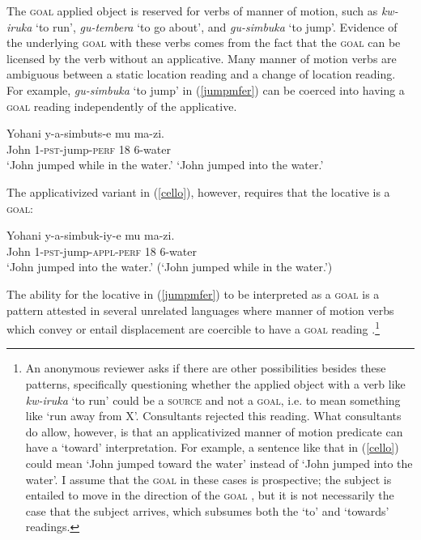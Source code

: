\documentclass[output=paper]{langsci/langscibook}
\begin{document}
The {\scshape goal} applied object is reserved for verbs of manner of motion, such as \emph{kw-iruka} `to run', \emph{gu-tembera} `to go about', and \emph{gu-simbuka} `to jump'. Evidence of the underlying {\scshape goal}  with these verbs comes from the fact that the {\scshape goal} can be licensed by the verb without an applicative.
	      \iffalse
	      \begin{exe}
		      \ex\gll Yohani y-iruts-e i-ruhanda.\\
				      John 	{\scshape 1-}run-{\scshape perf} 5-road\\
				      \glt `John ran on the road.'
		      \end{exe}
		      \fi %
		Many manner of motion verbs are ambiguous between a static location reading and a change of location reading. For example, \emph{gu-simbuka} `to jump' in (\ref{jumpmfer}) can be coerced into having a {\scshape goal}  reading independently of the applicative.		
	      \begin{exe}
		      \ex\label{jumpmfer}\gll Yohani y-a-simbuts-e mu ma-zi.\\
			      John 	1-{\scshape pst-}jump-{\scshape perf} 18 6-water\\
			      \glt `John jumped while in the water.'
			      \glt `John jumped into the water.'
	      \end{exe}
%
The applicativized variant in (\ref{cello}), however, requires that the locative is a {\scshape goal}:
		      \begin{exe}
		      \ex\label{cello} \gll Yohani y-a-simbuk-iy-e mu ma-zi.\\
			      John 1-{\scshape pst}-jump-{\scshape appl-perf} 18 6-water\\
			      \glt `John jumped into the water.'
			      \glt \bad (`John jumped while in the water.')
		      \end{exe}
The ability for the locative in (\ref{jumpmfer}) to be interpreted as a {\scshape goal}  is a pattern attested in several unrelated languages where manner of motion verbs which convey or entail displacement are coercible to have a {\scshape goal}  reading \citep{nikitina:2008,thametal:2012,bassa:2013}.\footnote{An anonymous reviewer asks if there are other possibilities besides these patterns, specifically questioning whether the applied object with a verb like \emph{kw-iruka} `to run' could be a {\scshape source} and not a {\scshape goal}, i.e. to mean something like `run away from X'. Consultants rejected this reading. What consultants do allow, however, is that an applicativized manner of motion predicate can have a `toward' interpretation. For example, a sentence like that in (\ref{cello}) could mean `John jumped toward the water' instead of `John jumped into the water'. I assume that the {\scshape goal}  in these cases is prospective; the subject is entailed to move in the direction of the {\scshape goal} , but it is not necessarily the case that the subject arrives, which subsumes both the `to' and `towards' readings.} 
	      
\end{document}
